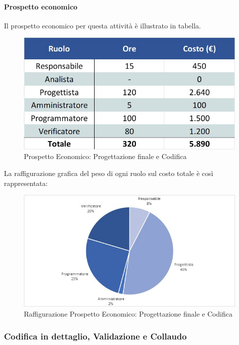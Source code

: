 \paragraph{Prospetto economico}
Il prospetto economico per questa attività è illustrato in tabella. 
\begin{figure}[h!]
	\centerline{\includegraphics[scale=0.4]{img/Preventivo/ProgettazioneFinaleCodificaEconomico.jpg}}
	\caption{Prospetto Economico: Progettazione finale e Codifica}
\end{figure}
La raffigurazione grafica del peso di ogni ruolo sul costo totale è così rappresentata: 
\begin{figure}[h!]
	\centerline{\includegraphics[scale=0.4]{img/Preventivo/Torte/ProgettazioneFinaleCodifica.jpg}}
	\caption{Raffigurazione Prospetto Economico: Progettazione finale e Codifica}
\end{figure} 

\subsubsection{Codifica in dettaglio, Validazione e Collaudo}
